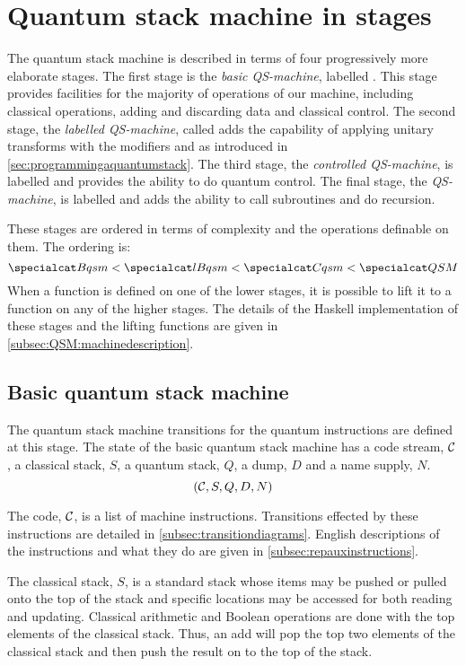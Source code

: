 \section{Quantum stack machine in stages}\label{sec:qsmstate}
The quantum stack machine is described in terms of four 
progressively more elaborate stages. The first stage is
the   \emph{basic QS-machine}, labelled \bms. This stage provides
 facilities for the majority of operations
of our machine, including classical operations, adding and discarding data
 and classical control. The second stage, the \emph{labelled QS-machine},
called \lbms{} adds the capability of applying 
unitary transforms with the modifiers 
 and  as introduced in 
\ref{sec:programmingaquantumstack}. 
The third stage, the  \emph{controlled QS-machine}, is labelled \cms{} and 
provides the
ability to do quantum control. The final stage,  the
\emph{QS-machine}, is labelled \ms{} and 
 adds the ability to call subroutines and do 
recursion.

These stages are ordered in terms of complexity and the
operations definable on them. The ordering is:
\[ \bms < \lbms < \cms < \ms\]
When a function is defined on one of the lower stages, it is possible
to lift it to a function on any of the higher stages. 
The details of the Haskell implementation of 
these stages and the lifting functions are given in 
\vref{subsec:QSM:machinedescription}.

\subsection{Basic quantum stack machine}\label{subsec:basicmachinestate}

The quantum stack machine transitions for the quantum instructions 
 are defined  at this stage.
The state of the basic quantum stack machine  has a code stream, $\mathcal{C}$, a
classical stack, $S$, a  quantum stack, $Q$, a dump, $D$ and a
name supply, $N$.
\begin{equation}
(\mathcal{C},S,Q,D,N)\label{eq:minimalmachinestate} \\
\end{equation}

The code, $\mathcal{C}$,  is a list of machine instructions. Transitions 
effected by these instructions are detailed in 
 \vref{subsec:transitiondiagrams}. English descriptions of the
instructions and what they do are given in 
 \vref{subsec:repauxinstructions}.


The classical stack, $S$, is a standard stack whose items may
be pushed or pulled onto the top of the stack and specific locations 
may be accessed for both reading and updating.
Classical arithmetic and Boolean operations are done with the top
elements of the classical stack. Thus, an add will pop the
top two elements of the classical stack and then push the result 
 on to the top of the stack.


